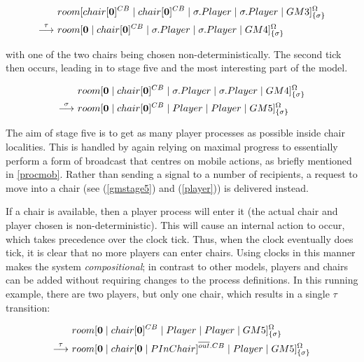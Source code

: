 \begin{equation}
\begin{aligned}
& {room}[ {chair}[ \textbf{0} ]^{CB} \;|\; {chair}[ \textbf{0} ]^{CB} \;|\; 
   \sigma.Player \;|\; \sigma.Player \;|\;
   GM3 ]^{\Omega}_{\{\sigma\}} \\
 \stackrel{\tau}{\longrightarrow}\ & {room}[ \textbf{0} \;|\; {chair}[ \textbf{0} ]^{CB} \;|\; 
   \sigma.Player \;|\; \sigma.Player \;|\;
   GM4 ]^{\Omega}_{\{\sigma\}}
\end{aligned}
\end{equation}

\noindent with one of the two chairs being chosen non-deterministically.
The second tick then occurs, leading in to stage five and the most
interesting part of the model.

\begin{equation}
\begin{aligned}
& {room}[ \textbf{0} \;|\; {chair}[ \textbf{0} ]^{CB} \;|\; 
   \sigma.Player \;|\; \sigma.Player \;|\;
   GM4 ]^{\Omega}_{\{\sigma\}} \\
\stackrel{\sigma}{\longrightarrow}\ & {room}[ \textbf{0} \;|\; {chair}[ \textbf{0} ]^{CB} \;|\; 
   Player \;|\; Player \;|\;
   GM5 ]^{\Omega}_{\{\sigma\}} \\
\end{aligned}
\end{equation}

The aim of stage five is to get as many player processes as possible
inside chair localities.  This is handled by again relying on maximal
progress to essentially perform a form of broadcast that centres on
mobile actions, as briefly mentioned in \ref{procmob}.  Rather than
sending a signal to a number of recipients, a request to move into a
chair (see (\ref{gmstage5}) and (\ref{player})) is delivered instead.

If a chair is available, then a player process will enter it (the actual
chair and player chosen is non-deterministic).  This will cause an
internal action to occur, which takes precedence over the clock tick.
Thus, when the clock eventually does tick, it is clear that no more
players can enter chairs. Using clocks in this manner makes the system
\emph{compositional}; in contrast to other models, players and chairs
can be added without requiring changes to the process definitions.  In
this running example, there are two players, but only one chair, which
results in a single $\tau$ transition:

\begin{equation}
\begin{aligned}
& {room}[ \textbf{0} \;|\; {chair}[ \textbf{0} ]^{CB} \;|\; 
   Player \;|\; Player \;|\;
   GM5 ]^{\Omega}_{\{\sigma\}} \\
\stackrel{\tau}{\longrightarrow}\ & {room}[ \textbf{0} \;|\; {chair}[ \textbf{0} \;|\; PInChair ]^{\overline{out}.CB} \;|\; 
   Player \;|\;
   GM5 ]^{\Omega}_{\{\sigma\}} \\
\end{aligned}
\end{equation}

